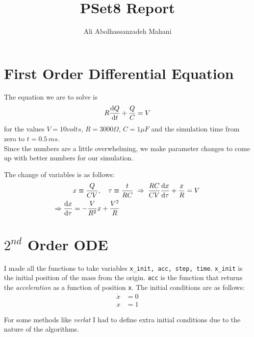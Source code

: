 \documentclass[12pt, a4paper]{article}
\title{PSet8 Report}
\author{Ali Abolhassanzadeh Mahani}
\begin{document}
	\maketitle
	\section{First Order Differential Equation}
	The equation we are to solve is
	\begin{equation}
		R \dv{Q}{t} + \frac{Q}{C} = V
	\end{equation}
	for the values $V= 10 volts$, $R = 3000 \Omega$, $C = 1 \mu F$ and the simulation time from zero to $t = 0.5\, ms$.\\
	Since the numbers are a little overwhelming, we make parameter changes to come up with better numbers for our simulation.
	
	The change of variables is as follows:
	\begin{equation}
		\begin{aligned}
			&x \equiv \frac{Q}{C V}, \quad \tau \equiv \frac{t}{R C} \;\Rightarrow \; \frac{R C}{C V} \dv{x}{\tau} + \frac{x}{R} = V\\
			\Rightarrow  \dv{x}{\tau} &= - \frac{V}{R^2} x + \frac{V^2}{R}
		\end{aligned}
	\end{equation}
	
	\section{$2^{nd}$ Order ODE}
	I made all the functions to take variables \texttt{x\_init, acc, step, time}. \texttt{x\_init} is the initial position of the mass from the origin.
	\texttt{acc} is the function that returns the \emph{acceleration} as a function of position \texttt{x}.
	The initial conditions are as follows:
	\begin{equation}
		\begin{aligned}
			\dot{x} &= 0\\
			x & = 1
		\end{aligned}
	\end{equation}
	
	For some methods like \emph{verlat} I had to define extra initial conditions due to the nature of the algorithms.
	
\end{document}
